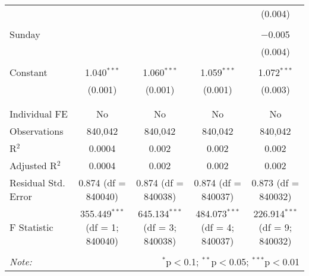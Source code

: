 \documentclass[
]{article}
\begin{document}
\begin{table}[!htbp]
{\begin{tabular}{@{\extracolsep{5pt}}lcccc}
  &  &  &  & (0.004) \\ 
  & & & & \\ 
 Sunday &  &  &  & $-$0.005 \\ 
  &  &  &  & (0.004) \\ 
  & & & & \\ 
 Constant & 1.040$^{***}$ & 1.060$^{***}$ & 1.059$^{***}$ & 1.072$^{***}$ \\ 
  & (0.001) & (0.001) & (0.001) & (0.003) \\ 
  & & & & \\ 
\hline \\[-1.8ex] 
Individual FE & No & No & No & No \\ 
Observations & 840,042 & 840,042 & 840,042 & 840,042 \\ 
R$^{2}$ & 0.0004 & 0.002 & 0.002 & 0.002 \\ 
Adjusted R$^{2}$ & 0.0004 & 0.002 & 0.002 & 0.002 \\ 
Residual Std. Error & 0.874 (df = 840040) & 0.874 (df = 840038) & 0.874 (df = 840037) & 0.873 (df = 840032) \\ 
F Statistic & 355.449$^{***}$ (df = 1; 840040) & 645.134$^{***}$ (df = 3; 840038) & 484.073$^{***}$ (df = 4; 840037) & 226.914$^{***}$ (df = 9; 840032) \\ 
\hline 
\hline \\[-1.8ex] 
\textit{Note:}  & \multicolumn{4}{r}{$^{*}$p$<$0.1; $^{**}$p$<$0.05; $^{***}$p$<$0.01} \\ 
\end{tabular}
} 
\end{table} 
\newpage
\end{document}
